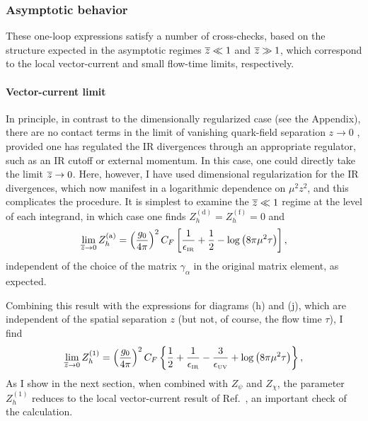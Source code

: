 \subsubsection{Asymptotic behavior}
These one-loop expressions satisfy a number of cross-checks, based on the structure expected in the asymptotic regimes $\overline{z} \ll1 $ and $\overline{z} \gg 1$, which correspond to the local vector-current and small flow-time limits, respectively.

\paragraph{Vector-current limit} In principle, in contrast to the dimensionally regularized case (see the Appendix), there are no contact terms in the limit of vanishing quark-field separation $z\to 0$ \cite{Constantinou:2017sej}, provided one has regulated the IR divergences through an appropriate regulator, such as an IR cutoff or external momentum. In this case, one could directly take the limit $\overline{z}\to 0$. Here, however, I have used dimensional regularization for the IR divergences, which now manifest in a logarithmic dependence on $\mu^2z^2$, and this complicates the procedure. It is simplest to examine the $\overline{z}\ll 1$ regime at the level of each integrand, in which case one finds $Z_h^\mathrm{(d)}=Z_h^\mathrm{(f)}=0$ and
\begin{equation}
\lim_{\overline{z} \to 0}Z_h^\mathrm{(a)} =  \left(\frac{g_0}{4\pi}\right)^2C_F \left[\frac{1}{\epsilon_{\scriptscriptstyle\mathrm{IR}}}+\frac{1}{2} - \log\left(8\pi\mu^2\tau\right)\right],
\end{equation}
independent of the choice of the matrix $\gamma_\alpha$ in the original matrix element, as expected.

Combining this result with the expressions for diagrams (h) and (j), which are independent of the spatial separation $z$ (but not, of course, the flow time $\tau$), I find
\begin{equation}
\lim_{\overline{z} \to 0}Z_h^{(1)} = \left(\frac{g_0}{4\pi}\right)^2C_F \left\{\frac{1}{2}+\frac{1}{\epsilon_{\scriptscriptstyle\mathrm{IR}}}-\frac{3}{\epsilon_{\scriptscriptstyle\mathrm{UV}}} + \log\left(8\pi\mu^2\tau\right)\right\},\label{eq:hoztozero}
\end{equation}
As I show in the next section, when combined with $Z_\psi$ and $Z_\chi$, the parameter $Z_h^{(1)}$ reduces to the local vector-current result of Ref.~\cite{Hieda:2016lly}, an important check of the calculation.

